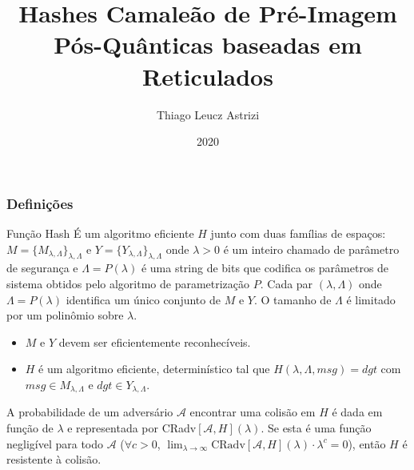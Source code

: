 \documentclass{beamer}
\title{Hashes Camaleão de Pré-Imagem Pós-Quânticas baseadas em
Reticulados}
\author{Thiago Leucz Astrizi}
\institute{UFSC}
\date{2020}
\begin{document}
\frame{\titlepage}

\begin{frame}
    \frametitle{Definições}
    \begin{block}{Função Hash}
    É um algoritmo eficiente $H$ junto com duas famílias de espaços: $M=\{M_{\lambda, \Lambda}\}_{\lambda, \Lambda}$ e $Y=\{Y_{\lambda, \Lambda}\}_{\lambda, \Lambda}$ onde $\lambda > 0$ é um inteiro chamado de parâmetro de segurança e 
    $\Lambda = P(\lambda)$ é uma string de bits que codifica os parâmetros de sistema obtidos pelo algoritmo de parametrização $P$. Cada par $(\lambda, \Lambda)$ onde $\Lambda = P(\lambda)$ identifica um único conjunto de $M$ e $Y$. O tamanho de $\Lambda$ é limitado por um polinômio sobre $\lambda$.
    \begin{itemize}
        \item $M$ e $Y$ devem ser eficientemente reconhecíveis.
        \item $H$ é um algoritmo eficiente, determinístico tal que $H(\lambda, \Lambda, msg) = dgt$ com $msg\in M_{\lambda, \Lambda}$ e $dgt \in Y_{\lambda,\Lambda}$.
    \end{itemize}
    \end{block}
    A probabilidade de um adversário $\mathcal{A}$ encontrar uma colisão em $H$ é dada em função de $\lambda$ e representada por CRadv$[\mathcal{A}, H](\lambda)$. Se esta é uma função negligível para todo $\mathcal{A}$ ($\forall c>0$, $\lim_{\lambda\rightarrow\infty}\textrm{CRadv}[\mathcal{A}, H](\lambda)\cdot\lambda^c = 0$), então $H$ é resistente à colisão.
\end{frame}
\end{document}
